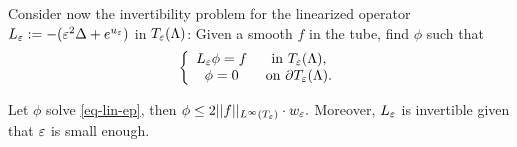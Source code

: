 Consider now the invertibility problem for the linearized operator
$L_\varepsilon:=-(\varepsilon^2 \Delta + e^{u_\varepsilon})$ in $T_\varepsilon(\Lambda)$: Given a smooth $f$ in
the tube, find $\phi$ such that
\begin{equation}
    \label{eq-lin-ep}
    \left\{
    \begin{array}{cc}
        L_\varepsilon\phi = f & \mbox{ in }T_\varepsilon(\Lambda),\\
        \phi = 0& \mbox{ on } \partial T_\varepsilon(\Lambda).
    \end{array}
    \right.
\end{equation}

\begin{lemma} Let $\phi$ solve \ref{eq-lin-ep}, then
    \label{lem-phi}
    $\phi\leq 2 ||f||_{L^\infty(T_\varepsilon)}\cdot w_\varepsilon. $
    Moreover, $L_\varepsilon$ is invertible given that $\varepsilon$ is small enough.
\end{lemma}

